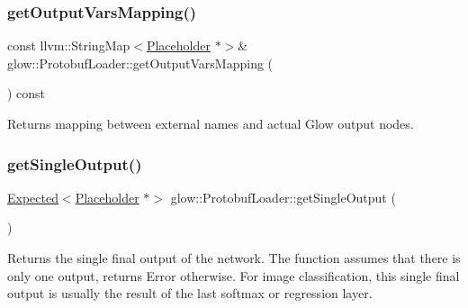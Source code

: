 \subsubsection{\texorpdfstring{get\+Output\+Vars\+Mapping()}{getOutputVarsMapping()}}
{\footnotesize\ttfamily const llvm\+::\+String\+Map$<$\hyperlink{classglow_1_1_placeholder}{Placeholder} $\ast$$>$\& glow\+::\+Protobuf\+Loader\+::get\+Output\+Vars\+Mapping (\begin{DoxyParamCaption}{ }\end{DoxyParamCaption}) const\hspace{0.3cm}{\ttfamily [inline]}}

\begin{DoxyReturn}{Returns}
mapping between external names and actual Glow output nodes. 
\end{DoxyReturn}
\mbox{\label{classglow_1_1_protobuf_loader_a84d14ec2ce55c5fd11a96fe688435b40}} 
\subsubsection{\texorpdfstring{get\+Single\+Output()}{getSingleOutput()}}
{\footnotesize\ttfamily \hyperlink{classglow_1_1detail_1_1_glow_expected}{Expected}$<$\hyperlink{classglow_1_1_placeholder}{Placeholder} $\ast$$>$ glow\+::\+Protobuf\+Loader\+::get\+Single\+Output (\begin{DoxyParamCaption}{ }\end{DoxyParamCaption})\hspace{0.3cm}{\ttfamily [inline]}}

\begin{DoxyReturn}{Returns}
the single final output of the network. The function assumes that there is only one output, returns Error otherwise. For image classification, this single final output is usually the result of the last softmax or regression layer. 
\end{DoxyReturn}
\mbox{\label{classglow_1_1_protobuf_loader_abcb6af3498f15a1d84bc8800dda2a8e2}} 
